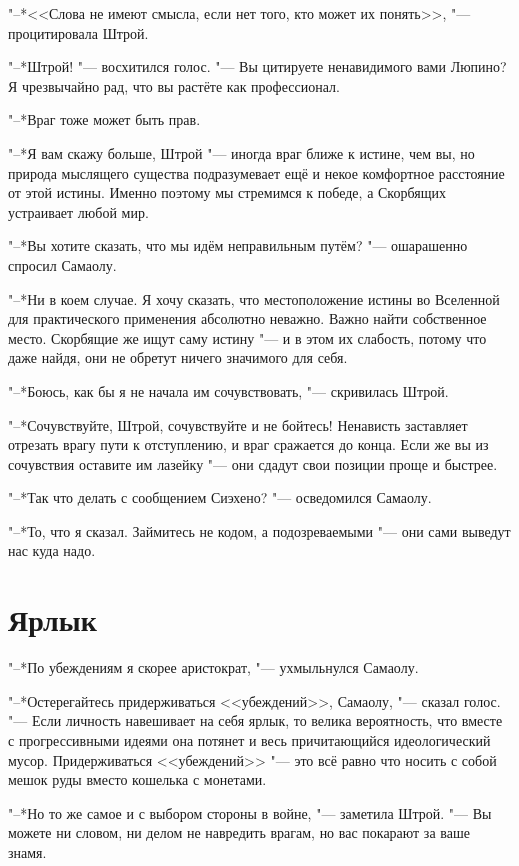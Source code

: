 \documentclass[a4paper,10pt,fleqn]{book}
\begin{document}
"--*<<Слова не имеют смысла, если нет того, кто может их понять>>, "--- процитировала Штрой.

"--*Штрой! "--- восхитился голос.
"--- Вы цитируете ненавидимого вами Люпино?
Я чрезвычайно рад, что вы растёте как профессионал.

"--*Враг тоже может быть прав.

"--*Я вам скажу больше, Штрой "--- иногда враг ближе к истине, чем вы, но природа мыслящего существа подразумевает ещё и некое комфортное расстояние от этой истины.
Именно поэтому мы стремимся к победе, а Скорбящих устраивает любой мир.

"--*Вы хотите сказать, что мы идём неправильным путём? "--- ошарашенно спросил Самаолу.

"--*Ни в коем случае.
Я хочу сказать, что местоположение истины во Вселенной для практического применения абсолютно неважно.
Важно найти собственное место.
Скорбящие же ищут саму истину "--- и в этом их слабость, потому что даже найдя, они не обретут ничего значимого для себя.

"--*Боюсь, как бы я не начала им сочувствовать, "--- скривилась Штрой.

"--*Сочувствуйте, Штрой, сочувствуйте и не бойтесь!
Ненависть заставляет отрезать врагу пути к отступлению, и враг сражается до конца.
Если же вы из сочувствия оставите им лазейку "--- они сдадут свои позиции проще и быстрее.

"--*Так что делать с сообщением Сиэхено? "--- осведомился Самаолу.

"--*То, что я сказал.
Займитесь не кодом, а подозреваемыми "--- они сами выведут нас куда надо.

\section{Ярлык}

"--*По убеждениям я скорее аристократ, "--- ухмыльнулся Самаолу.

"--*Остерегайтесь придерживаться <<убеждений>>, Самаолу, "--- сказал голос.
"--- Если личность навешивает на себя ярлык, то велика вероятность, что вместе с прогрессивными идеями она потянет и весь причитающийся идеологический мусор.
Придерживаться <<убеждений>> "--- это всё равно что носить с собой мешок руды вместо кошелька с монетами.

"--*Но то же самое и с выбором стороны в войне, "--- заметила Штрой.
"--- Вы можете ни словом, ни делом не навредить врагам, но вас покарают за ваше знамя.
\end{document}
